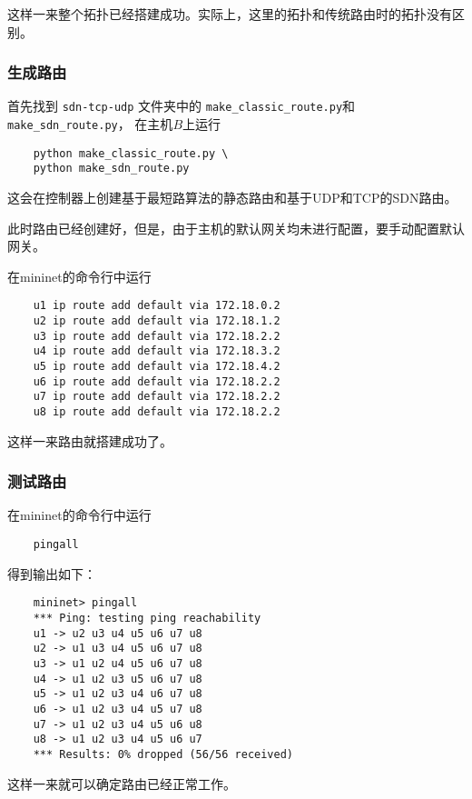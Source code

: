 这样一来整个拓扑已经搭建成功。实际上，这里的拓扑和传统路由时的拓扑没有区别。

\subsubsection{生成路由}
首先找到 \texttt{sdn-tcp-udp} 文件夹中的 
\texttt{make\_classic\_route.py}和
\texttt{make\_sdn\_route.py}，
在主机$B$上运行

\begin{lstlisting}
	python make_classic_route.py \
	python make_sdn_route.py
\end{lstlisting}

这会在控制器上创建基于最短路算法的静态路由和基于UDP和TCP的SDN路由。

此时路由已经创建好，但是，由于主机的默认网关均未进行配置，要手动配置默认网关。

在mininet的命令行中运行

\begin{lstlisting}
	u1 ip route add default via 172.18.0.2 
	u2 ip route add default via 172.18.1.2
	u3 ip route add default via 172.18.2.2
	u4 ip route add default via 172.18.3.2
	u5 ip route add default via 172.18.4.2
	u6 ip route add default via 172.18.2.2
	u7 ip route add default via 172.18.2.2
	u8 ip route add default via 172.18.2.2
\end{lstlisting}

这样一来路由就搭建成功了。

\subsubsection{测试路由}

在mininet的命令行中运行

\begin{lstlisting}
	pingall
\end{lstlisting}

得到输出如下：

\begin{lstlisting}
	mininet> pingall
	*** Ping: testing ping reachability
	u1 -> u2 u3 u4 u5 u6 u7 u8 
	u2 -> u1 u3 u4 u5 u6 u7 u8 
	u3 -> u1 u2 u4 u5 u6 u7 u8 
	u4 -> u1 u2 u3 u5 u6 u7 u8 
	u5 -> u1 u2 u3 u4 u6 u7 u8 
	u6 -> u1 u2 u3 u4 u5 u7 u8 
	u7 -> u1 u2 u3 u4 u5 u6 u8 
	u8 -> u1 u2 u3 u4 u5 u6 u7 
	*** Results: 0% dropped (56/56 received)
\end{lstlisting}

这样一来就可以确定路由已经正常工作。

